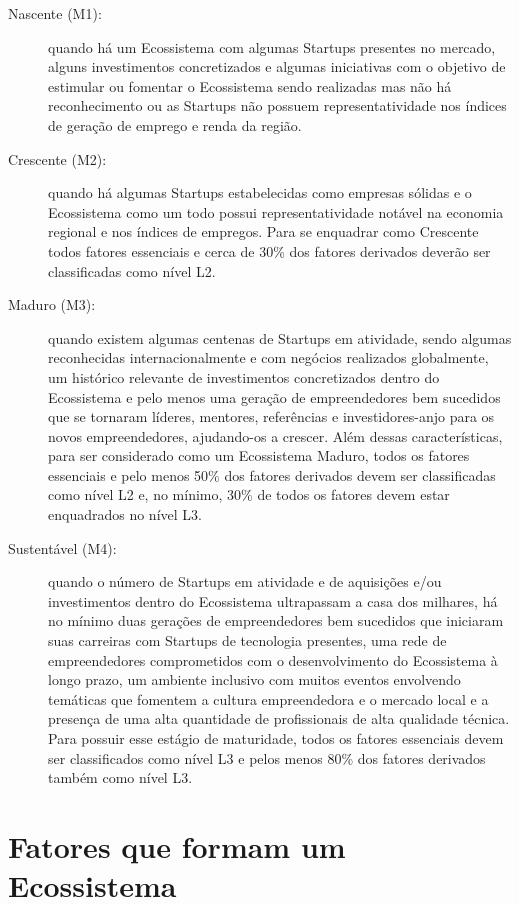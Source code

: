 \begin{description}
  \item [Nascente (M1):] quando há um Ecossistema com algumas Startups presentes no mercado, alguns investimentos concretizados e algumas iniciativas com o objetivo de estimular ou fomentar o Ecossistema sendo realizadas mas não há reconhecimento ou as Startups não possuem representatividade nos índices de geração de emprego e renda da região.

  \item [Crescente (M2):] quando há algumas Startups estabelecidas como empresas sólidas e o Ecossistema como um todo possui representatividade notável na economia regional e nos índices de empregos. Para se enquadrar como Crescente todos fatores essenciais e cerca de 30\% dos fatores derivados deverão ser classificadas como nível L2.

  \item [Maduro (M3):] quando existem algumas centenas de Startups em atividade, sendo algumas reconhecidas internacionalmente e com negócios realizados globalmente, um histórico relevante de investimentos concretizados dentro do Ecossistema e pelo menos uma geração de empreendedores bem sucedidos que se tornaram líderes, mentores, referências e investidores-anjo para os novos empreendedores, ajudando-os a crescer. Além dessas características, para ser considerado como um Ecossistema Maduro, todos os fatores essenciais e pelo menos 50\% dos fatores derivados devem ser classificadas como nível L2 e, no mínimo, 30\% de todos os fatores devem estar enquadrados no nível L3.

  \item [Sustentável (M4):] quando o número de Startups em atividade e de aquisições e/ou investimentos dentro do Ecossistema ultrapassam a casa dos milhares, há no mínimo duas gerações de empreendedores bem sucedidos que iniciaram suas carreiras com Startups de tecnologia presentes, uma rede de empreendedores comprometidos com o desenvolvimento do Ecossistema à longo prazo, um ambiente inclusivo com muitos eventos envolvendo temáticas que fomentem a cultura empreendedora e o mercado local e a presença de uma alta quantidade de profissionais de alta qualidade técnica. Para possuir esse estágio de maturidade, todos os fatores essenciais devem ser classificados como nível L3 e pelos menos 80\% dos fatores derivados também como nível L3.
\end{description}

\section{Fatores que formam um Ecossistema}
\label{subsection:fatores_que_formam_um_ecossistema}

